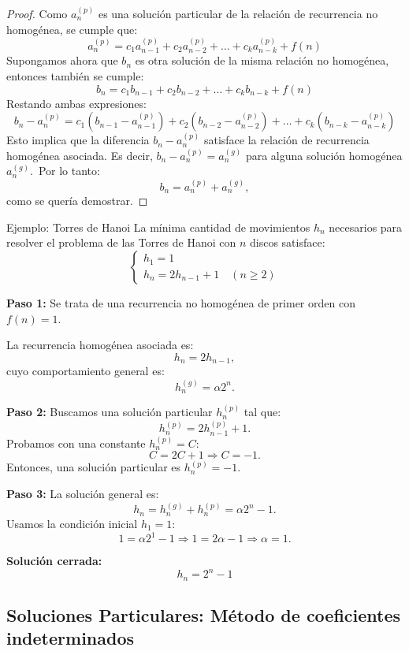 \begin{proof}
Como $a_n^{(p)}$ es una solución particular de la relación de recurrencia no homogénea, se cumple que:
\[
a^{(p)}_n = c_1a^{(p)}_{n-1} + c_2a^{(p)}_{n-2} + \dots + c_ka^{(p)}_{n-k} + f(n)
\]
Supongamos ahora que $b_n$ es otra solución de la misma relación no homogénea, entonces también se cumple:
\[
b_n = c_1b_{n-1} + c_2b_{n-2} + \dots + c_kb_{n-k} + f(n)
\]
Restando ambas expresiones:
\[
b_n - a^{(p)}_n = c_1(b_{n-1} - a^{(p)}_{n-1}) + c_2(b_{n-2} - a^{(p)}_{n-2}) + \dots + c_k(b_{n-k} - a^{(p)}_{n-k})
\]
Esto implica que la diferencia $b_n - a_n^{(p)}$ satisface la relación de recurrencia homogénea asociada. Es decir, $b_n - a_n^{(p)} = a_n^{(g)}$ para alguna solución homogénea $a_n^{(g)}$.\
Por lo tanto:
\[
b_n = a_n^{(p)} + a_n^{(g)},
\]
como se quería demostrar.
\end{proof}

\begin{exampleblock}{Ejemplo: Torres de Hanoi}
La mínima cantidad de movimientos $h_n$ necesarios para resolver el problema de las Torres de Hanoi con $n$ discos satisface:
\[
\begin{cases}
h_1 = 1 \\
h_n = 2 h_{n-1} + 1 \quad (n \geq 2)
\end{cases}
\]

\textbf{Paso 1:} Se trata de una recurrencia no homogénea de primer orden con $f(n)=1$.

La recurrencia homogénea asociada es:
\[
h_n = 2 h_{n-1},
\]
cuyo comportamiento general es:
\[
h_n^{(g)} = \alpha 2^n.
\]

\textbf{Paso 2:} Buscamos una solución particular $h_n^{(p)}$ tal que:
\[
h_n^{(p)} = 2 h_{n-1}^{(p)} + 1.
\]
Probamos con una constante $h_n^{(p)} = C$:
\[
C = 2C + 1 \Rightarrow C = -1.
\]
Entonces, una solución particular es $h_n^{(p)} = -1$.

\textbf{Paso 3:} La solución general es:
\[
h_n = h_n^{(g)} + h_n^{(p)} = \alpha 2^n - 1.
\]
Usamos la condición inicial $h_1 = 1$:
\[
1 = \alpha 2^1 - 1 \Rightarrow 1 = 2\alpha - 1 \Rightarrow \alpha = 1.
\]

\textbf{Solución cerrada:}
\[
\boxed{h_n = 2^n - 1}
\]
\end{exampleblock}

\subsection{Soluciones Particulares: Método de coeficientes indeterminados}

